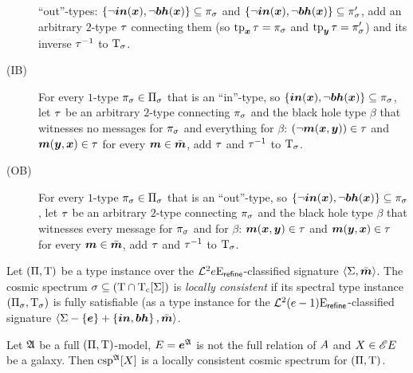 \begin{definition}
\begin{description}
  ``out''-types:
  $\left\{\lnot\bm{in}(\bm{x}),\lnot\bm{bh}(\bm{x})\right\} \subseteq \pi_\sigma$ and
  $\left\{\lnot\bm{in}(\bm{x}),\lnot\bm{bh}(\bm{x})\right\} \subseteq \pi_\sigma'$, add an arbitrary 
  $2$-type $\tau$ connecting them (so $\operatorname{tp}_{\bm{x}}\tau = \pi_\sigma$ and $\operatorname{tp}_{\bm{y}}\tau
  = \pi_\sigma'$) and its inverse $\tau^{-1}$ to $\mathrm{T}_\sigma$.
  \item[(IB)] For every $1$-type $\pi_\sigma \in
  \Pi_\sigma$ that is an ``in''-type, so
  $\left\{\bm{in}(\bm{x}),\lnot\bm{bh}(\bm{x})\right\} \subseteq \pi_\sigma$, let $\tau$ be an
  arbitrary $2$-type connecting $\pi_\sigma$ and the black hole type $\beta$
  that witnesses no messages for $\pi_\sigma$ and everything for $\beta$:
  $(\lnot\bm{m}(\bm{x},\bm{y})) \in \tau$ and $\bm{m}(\bm{y},\bm{x}) \in \tau$ for every $\bm{m}
  \in \bar{\bm{m}}$, add $\tau$ and $\tau^{-1}$ to $\mathrm{T}_\sigma$.
  \item[(OB)] For every $1$-type $\pi_\sigma \in
  \Pi_\sigma$ that is an ``out''-type, so
  $\left\{\lnot\bm{in}(\bm{x}),\lnot\bm{bh}(\bm{x})\right\} \subseteq \pi_\sigma$,
  let $\tau$ be an arbitrary $2$-type connecting $\pi_\sigma$ and the black
  hole type $\beta$ that witnesses every message for $\pi_\sigma$ and for
  $\beta$: $\bm{m}(\bm{x},\bm{y}) \in \tau$ and $\bm{m}(\bm{y},\bm{x}) \in \tau$ for every $\bm{m}
  \in \bar{\bm{m}}$, add $\tau$ and $\tau^{-1}$ to $\mathrm{T}_\sigma$.
\end{description}
\end{definition}
\begin{definition}
Let $(\Pi,\mathrm{T})$ be a type instance over the
$\mathcal{L}^{2}_{{}}{e}\mathrm{E}_{\mathsf{refine}}$-classified signature $\left\langle \mathrm{\Sigma},\bar{\bm{m}} \right\rangle$.
The cosmic spectrum $\sigma \subseteq (\mathrm{T} \cap \mathrm{T}_{\mathrm{c}}[\mathrm{\Sigma}])$ is
\emph{locally consistent} if its spectral type instance
$(\Pi_\sigma, \mathrm{T}_\sigma)$ is fully satisfiable (as a type instance for the
$\mathcal{L}^{2}_{{}}{(e-1)}\mathrm{E}_{\mathsf{refine}}$-classified signature
$\left\langle \mathrm{\Sigma} - \left\{\bm{e}\right\} + \left\{\bm{in}, \bm{bh}\right\},\bar{\bm{m}} \right\rangle$.
\end{definition}
\begin{remark}\label{rem:csp-is-locally-consistent}
Let $\mathfrak{A}$ be a full $(\Pi,\mathrm{T})$-model, $E = \bm{e}^{\mathfrak{A}}$ is not the
full relation of $A$ and $X \in {\mathscr{E}E}$ be a galaxy. Then
$\operatorname{csp}^{\mathfrak{A}}[X]$ is a locally consistent cosmic spectrum for $(\Pi,\mathrm{T})$.
\end{remark}
